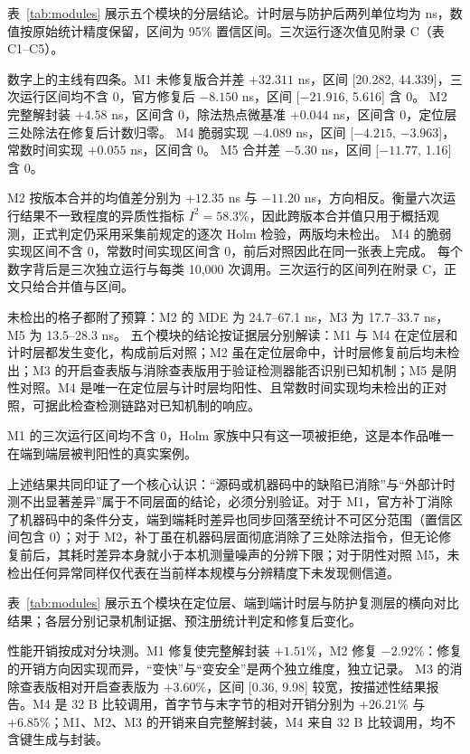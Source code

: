 表~\ref{tab:modules} 展示五个模块的分层结论。计时层与防护后两列单位均为 ns，数值按原始统计精度保留，区间为 95\% 置信区间。三次运行逐次值见附录 C（表 C1--C5）。

数字上的主线有四条。M1 未修复版合并差 $+32.311$ ns，区间 [20.282, 44.339]，三次运行区间均不含 0，官方修复后 $-8.150$ ns，区间 [$-21.916$, 5.616] 含 0。%
M2 完整解封装 $+4.58$ ns，区间含 0，除法热点微基准 $+0.044$ ns，区间含 0，定位层三处除法在修复后计数归零。%
M4 脆弱实现 $-4.089$ ns，区间 [$-4.215$, $-3.963$]，常数时间实现 $+0.055$ ns，区间含 0。%
M5 合并差 $-5.30$ ns，区间 [$-11.77$, 1.16] 含 0。%

M2 按版本合并的均值差分别为 $+12.35$ ns 与 $-11.20$ ns，方向相反。衡量六次运行结果不一致程度的异质性指标 $I^2=58.3\%$，因此跨版本合并值只用于概括观测，正式判定仍采用采集前规定的逐次 Holm 检验，两版均未检出。%
M4 的脆弱实现区间不含 0，常数时间实现区间含 0，前后对照因此在同一张表上完成。%
每个数字背后是三次独立运行与每类 10,000 次调用。三次运行的区间列在附录 C，正文只给合并值与区间。

未检出的格子都附了预算：M2 的 MDE 为 24.7--67.1 ns，M3 为 17.7--33.7 ns，M5 为 13.5--28.3 ns。%
五个模块的结论按证据层分别解读：M1 与 M4 在定位层和计时层都发生变化，构成前后对照；M2 虽在定位层命中，计时层修复前后均未检出；M3 的开启查表版与消除查表版用于验证检测器能否识别已知机制；M5 是阴性对照。M4 是唯一在定位层与计时层均阳性、且常数时间实现均未检出的正对照，可据此检查检测链路对已知机制的响应。

M1 的三次运行区间均不含 0，Holm 家族中只有这一项被拒绝，这是本作品唯一在端到端层被判阳性的真实案例。%

上述结果共同印证了一个核心认识：“源码或机器码中的缺陷已消除”与“外部计时测不出显著差异”属于不同层面的结论，必须分别验证。对于 M1，官方补丁消除了机器码中的条件分支，端到端耗时差异也同步回落至统计不可区分范围（置信区间包含 0）；对于 M2，补丁虽在机器码层面彻底消除了三处除法指令，但无论修复前后，其耗时差异本身就小于本机测量噪声的分辨下限；对于阴性对照 M5，未检出任何异常同样仅代表在当前样本规模与分辨精度下未发现侧信道。

表~\ref{tab:modules} 展示五个模块在定位层、端到端计时层与防护复测层的横向对比结果；各层分别记录机制证据、预注册统计判定和修复后变化。

性能开销按成对分块测。M1 修复使完整解封装 $+1.51\%$，M2 修复 $-2.92\%$：修复的开销方向因实现而异，“变快”与“变安全”是两个独立维度，独立记录。%
M3 的消除查表版相对开启查表版为 $+3.60\%$，区间 [0.36, 9.98] 较宽，按描述性结果报告。M4 是 32 B 比较调用，首字节与末字节的相对开销分别为 $+26.21\%$ 与 $+6.85\%$；M1、M2、M3 的开销来自完整解封装，M4 来自 32 B 比较调用，均不含键生成与封装。

